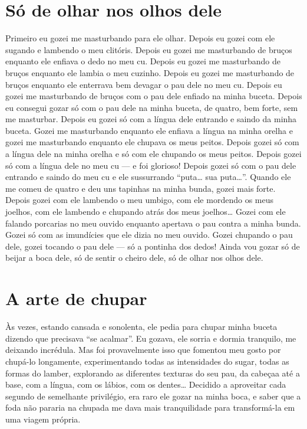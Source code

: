 \chapter{Só de olhar nos olhos dele}

Primeiro eu gozei me masturbando para ele olhar. Depois eu gozei com ele
sugando e lambendo o meu clitóris. Depois eu gozei me masturbando de
bruços enquanto ele enfiava o dedo no meu cu. Depois eu gozei me
masturbando de bruços enquanto ele lambia o meu cuzinho. Depois eu gozei
me masturbando de bruços enquanto ele enterrava bem devagar o pau dele
no meu cu. Depois eu gozei me masturbando de bruços com o pau dele
enfiado na minha buceta. Depois eu consegui gozar só com o pau dele na
minha buceta, de quatro, bem forte, sem me masturbar. Depois eu gozei só
com a língua dele entrando e saindo da minha buceta. Gozei me
masturbando enquanto ele enfiava a língua na minha orelha e gozei me
masturbando enquanto ele chupava os meus peitos. Depois gozei só com a
língua dele na minha orelha e só com ele chupando os meus peitos. Depois
gozei só com a língua dele no meu cu --- e foi glorioso! Depois gozei só
com o pau dele entrando e saindo do meu cu e ele sussurrando
``puta… sua puta…''. Quando ele me comeu de quatro e deu
uns tapinhas na minha bunda, gozei mais forte. Depois gozei com ele
lambendo o meu umbigo, com ele mordendo os meus joelhos, com ele
lambendo e chupando atrás dos meus joelhos… Gozei com ele falando
porcarias no meu ouvido enquanto apertava o pau contra a minha bunda.
Gozei só com as imundícies que ele dizia no meu ouvido. Gozei chupando o
pau dele, gozei tocando o pau dele --- só a pontinha dos dedos! Ainda
vou gozar só de beijar a boca dele, só de sentir o cheiro dele, só de
olhar nos olhos dele.

\chapter{A arte de chupar}

Às vezes, estando cansada e sonolenta, ele pedia para chupar minha
buceta dizendo que precisava ``se acalmar''. Eu gozava, ele sorria e
dormia tranquilo, me deixando incrédula. Mas foi provavelmente isso que
fomentou meu gosto por chupá-lo longamente, experimentando todas as
intensidades do sugar, todas as formas do lamber, explorando as
diferentes texturas do seu pau, da cabeçaa até a base, com a língua, com
os lábios, com os dentes… Decidido a aproveitar cada segundo de
semelhante privilégio, era raro ele gozar na minha boca, e saber que a
foda não pararia na chupada me dava mais tranquilidade para
transformá-la em uma viagem própria.

